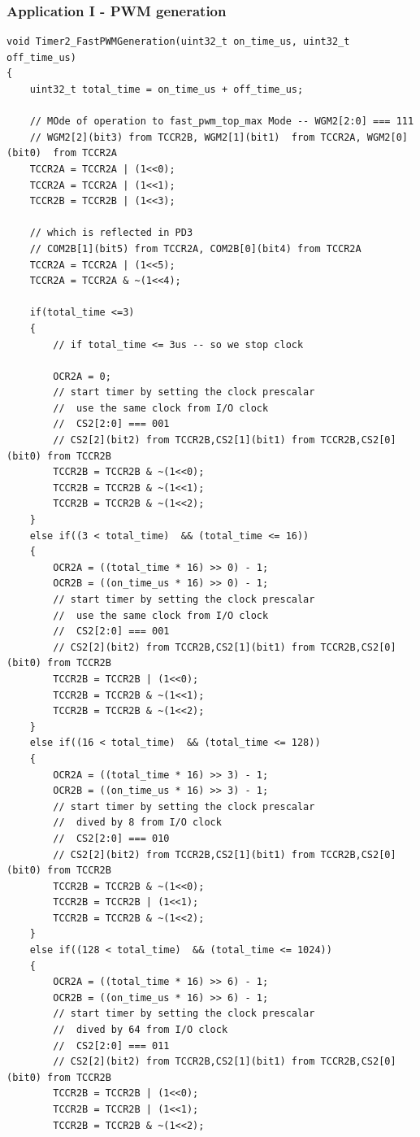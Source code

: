 \documentclass{article}
\begin{document}
\subsubsection{Application I - PWM generation}
\begin{verbatim}
void Timer2_FastPWMGeneration(uint32_t on_time_us, uint32_t off_time_us)
{
	uint32_t total_time = on_time_us + off_time_us;
		
	// MOde of operation to fast_pwm_top_max Mode -- WGM2[2:0] === 111
	// WGM2[2](bit3) from TCCR2B, WGM2[1](bit1)  from TCCR2A, WGM2[0](bit0)  from TCCR2A
	TCCR2A = TCCR2A | (1<<0);
	TCCR2A = TCCR2A | (1<<1);
	TCCR2B = TCCR2B | (1<<3);	

	// which is reflected in PD3
	// COM2B[1](bit5) from TCCR2A, COM2B[0](bit4) from TCCR2A
	TCCR2A = TCCR2A | (1<<5);
	TCCR2A = TCCR2A & ~(1<<4);
	
	if(total_time <=3)
	{
		// if total_time <= 3us -- so we stop clock
		
		OCR2A = 0;
		// start timer by setting the clock prescalar
		//  use the same clock from I/O clock
		//  CS2[2:0] === 001
		// CS2[2](bit2) from TCCR2B,CS2[1](bit1) from TCCR2B,CS2[0](bit0) from TCCR2B
		TCCR2B = TCCR2B & ~(1<<0);
		TCCR2B = TCCR2B & ~(1<<1);
		TCCR2B = TCCR2B & ~(1<<2);
	}
	else if((3 < total_time)  && (total_time <= 16))
	{
		OCR2A = ((total_time * 16) >> 0) - 1;
		OCR2B = ((on_time_us * 16) >> 0) - 1;
		// start timer by setting the clock prescalar
		//  use the same clock from I/O clock
		//  CS2[2:0] === 001
		// CS2[2](bit2) from TCCR2B,CS2[1](bit1) from TCCR2B,CS2[0](bit0) from TCCR2B
		TCCR2B = TCCR2B | (1<<0);
		TCCR2B = TCCR2B & ~(1<<1);
		TCCR2B = TCCR2B & ~(1<<2);
	}
	else if((16 < total_time)  && (total_time <= 128))
	{
		OCR2A = ((total_time * 16) >> 3) - 1;
		OCR2B = ((on_time_us * 16) >> 3) - 1;
		// start timer by setting the clock prescalar
		//  dived by 8 from I/O clock
		//  CS2[2:0] === 010
		// CS2[2](bit2) from TCCR2B,CS2[1](bit1) from TCCR2B,CS2[0](bit0) from TCCR2B
		TCCR2B = TCCR2B & ~(1<<0);
		TCCR2B = TCCR2B | (1<<1);
		TCCR2B = TCCR2B & ~(1<<2);
	}
	else if((128 < total_time)  && (total_time <= 1024))
	{
		OCR2A = ((total_time * 16) >> 6) - 1;
		OCR2B = ((on_time_us * 16) >> 6) - 1;
		// start timer by setting the clock prescalar
		//  dived by 64 from I/O clock
		//  CS2[2:0] === 011
		// CS2[2](bit2) from TCCR2B,CS2[1](bit1) from TCCR2B,CS2[0](bit0) from TCCR2B
		TCCR2B = TCCR2B | (1<<0);
		TCCR2B = TCCR2B | (1<<1);
		TCCR2B = TCCR2B & ~(1<<2);
		

\end{verbatim}
\end{document}
